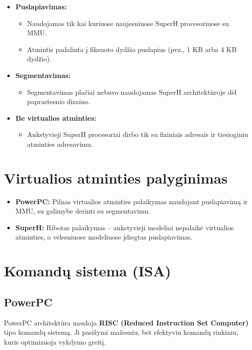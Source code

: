 \documentclass{article}
\begin{document}
\begin{itemize}
    \item \textbf{Puslapiavimas:}
        \begin{itemize}
            \item Naudojamas tik kai kuriuose naujesniuose SuperH procesoriuose su MMU.
            \item Atmintis padalinta į fiksuoto dydžio puslapius (pvz., 1 KB arba 4 KB dydžio).
        \end{itemize}
    \item \textbf{Segmentavimas:}
        \begin{itemize}
            \item Segmentavimas plačiai nebuvo naudojamas SuperH architektūroje dėl paprastesnio dizaino.
        \end{itemize}
    \item \textbf{Be virtualios atminties:}
        \begin{itemize}
            \item Ankstyvieji SuperH procesoriai dirbo tik su fiziniais adresais ir tiesioginiu atminties adresavimu.
        \end{itemize}
\end{itemize}

\section*{Virtualios atminties palyginimas}
\begin{itemize}
    \item \textbf{PowerPC:} Pilnas virtualios atminties palaikymas naudojant puslapiavimą ir MMU, su galimybe derinti su segmentavimu.
    \item \textbf{SuperH:} Ribotas palaikymas – ankstyvieji modeliai nepalaikė virtualios atminties, o vėlesniuose modeliuose įdiegtas puslapiavimas.
\end{itemize}
\section{Komandų sistema (ISA)}
\subsection{PowerPC}
PowerPC architektūra naudoja \textbf{RISC (Reduced Instruction Set Computer)} tipo komandų sistemą. Ji pasižymi mažesniu, bet efektyviu komandų rinkiniu, kuris optimizuoja vykdymo greitį.
\end{document}
